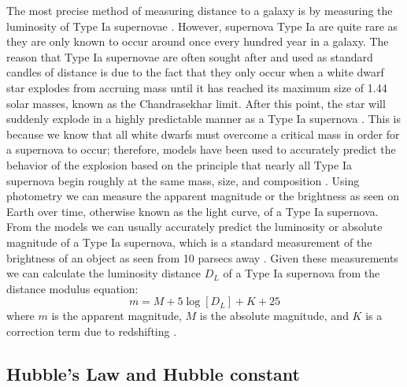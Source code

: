 The most precise method of measuring distance to a galaxy is by measuring the luminosity of Type Ia supernovae \cite{Branch1992:SNeIa+StandardCandles}\cite{Goobar1995:StandardCandles}. However, supernova Type Ia are quite rare as they are only known to occur around once every hundred year in a galaxy. The reason that Type Ia supernovae are often sought after and used as standard candles of distance is due to the fact that they only occur when a white dwarf star explodes from accruing mass until it has reached its maximum size of 1.44 solar masses, known as the Chandrasekhar limit. After this point, the star will suddenly explode in a highly predictable manner as a Type Ia supernova \cite{Carroll2001-CosmoReview+SNeIa+Lum}\cite{Krisciunas2005:SNeIa}\cite{Narayan2016:SNeIa+Redshift}. This is because we know that all white dwarfs must overcome a critical mass in order for a supernova to occur; therefore, models have been used to accurately predict the behavior of the explosion based on the principle that nearly all Type Ia supernova begin roughly at the same mass, size, and composition \cite{Goobar1995:StandardCandles}. Using photometry we can measure the apparent magnitude or the brightness as seen on Earth over time, otherwise known as the light curve, of a Type Ia supernova. From the models we can usually accurately predict the luminosity or absolute magnitude of a Type Ia supernova, which is a standard measurement of the brightness of an object as seen from 10 parsecs away \cite{Reiss2007:SNeIa}. Given these measurements we can calculate the luminosity distance $D_L$ of a Type Ia supernova from the distance modulus equation:
%
\begin{equation}\label{dm}
m = M + 5 \log [D_L] + K + 25
\end{equation}
%
where $m$ is the apparent magnitude, $M$ is the absolute magnitude, and $K$ is a correction term due to redshifting \cite{Carroll2001-CosmoReview+SNeIa+Lum}\cite{Narayan2016:SNeIa+Redshift}.



\subsection{Hubble's Law and Hubble constant}



